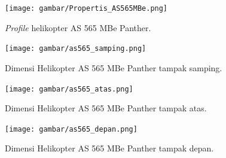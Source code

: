 \begin{figure}[H]
	\centering
	\texttt{[image: gambar/Propertis\_AS565MBe.png]}
	\caption{\textit{Profile} helikopter AS 565 MBe Panther.}
	\label{fig:AS565MBe}
\end{figure}

\begin{figure}[H]
	\centering
	\texttt{[image: gambar/as565\_samping.png]}
	\caption{Dimensi Helikopter AS 565 MBe Panther tampak samping.}
	\label{fig:as565mbe_samping}
\end{figure}

\begin{figure}[H]
	\centering
	\texttt{[image: gambar/as565\_atas.png]}
	\caption{Dimensi Helikopter AS 565 MBe Panther tampak atas.}
	\label{fig:as565mbe_atas}
\end{figure}

\begin{figure}[H]
	\centering
	\texttt{[image: gambar/as565\_depan.png]}
	\caption{Dimensi Helikopter AS 565 MBe Panther tampak depan.}
	\label{fig:as565mbe_depan}
\end{figure}